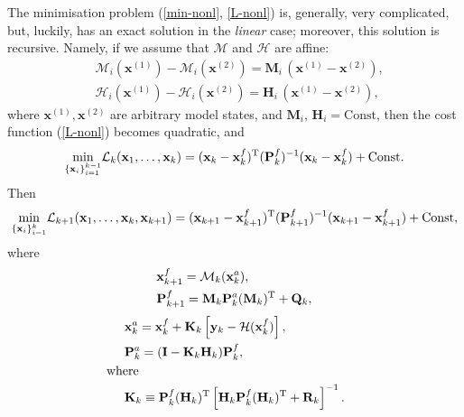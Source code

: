 \documentclass[11pt]{report}
\newcommand{\mb} {\mathbf}
\newcommand{\T}{^{\tiny \mathrm T}}
\begin{document}
The minimisation problem (\ref{min-nonl}, \ref{L-nonl}) is, generally, very complicated, but, luckily, has an exact solution in the \emph{linear} case; moreover, this solution is recursive.
Namely, if we assume that $\mathcal M$ and $\mathcal H$ are affine:
\begin{subequations}
  \label{lin}
  \begin{align}
    \label{lin-M}
    &\mathcal M_i(\mb x^{(1)}) - \mathcal M_i(\mb x^{(2)}) = \mb M_i \, (\mb x^{(1)} - \mb x^{(2)}),\\
    \label{lin-H}
    &\mathcal H_i(\mb x^{(1)}) - \mathcal H_i(\mb x^{(2)}) = \mb H_i \, (\mb x^{(1)} - \mb x^{(2)}),
  \end{align}
\end{subequations}
where $\mb x^{(1)}, \mb x^{(2)}$ are arbitrary model states, and $\mb M_i,\, \mb H_i = \mathrm{Const}$, then the cost function (\ref{L-nonl}) becomes quadratic, and
\begin{align*}
  \underset {\{\mb x_i\}_{i = 1}^{k - 1}}{\min} \mathcal L_k(\mb x_1, \dots, \mb x_k) = (\mb x_k - \mb x_k^f)\T (\mb P_{k}^f)^{-1}(\mb x_k - \mb x_k^f) + \mathrm{Const}.
\end{align*}
Then
\begin{align*}
    \underset {\{\mb x_i\}_{i = 1}^{k}}{\min} \mathcal L_{k+1}(\mb x_1, \dots, \mb x_k, \mb x_{k+1}) = (\mb x_{k+1} - \mb x_{k+1}^f)\T (\mb P_{k+1}^f)^{-1}(\mb x_{k+1} - \mb x_{k+1}^f) + \mathrm{Const},
\end{align*}
where
\begin{subequations}
  \label{kf-for}
  \begin{align}
    \label{prop-x}
    & \mb x^f_{k+1} = \mathcal M_k(\mb x_k^a),\\
    \label{prop-P}
    & \mb P_{k+1}^f = \mb M_k \mb P_k^a (\mb M_k)\T + \mb Q_k,
  \end{align}
\end{subequations}
\vspace{-5mm}
\begin{subequations}
  \label{kf-an}
  \begin{align}
    \label{kf-an-x}
    & \mb x_k^a = \mb x_k^f + \mb K_k \left [\mb y_k - \mathcal H(\mb x_k^f) \right ],\\
    \label{kf-an-P}
    & \mb P_k^a = (\mb I - \mb K_k \mb H_k) \mb P_k^f,\\
    \nonumber
    & \hspace{-0.5cm} \text{where}\\
    \label{kf-K}
    & \mb K_k \equiv \mb P^f_k (\mb H_k)\T \left [\mb H_k \mb P_k^f (\mb H_k)\T + \mb R_k \right ]^{-1}.
  \end{align}
\end{subequations}
\end{document}
